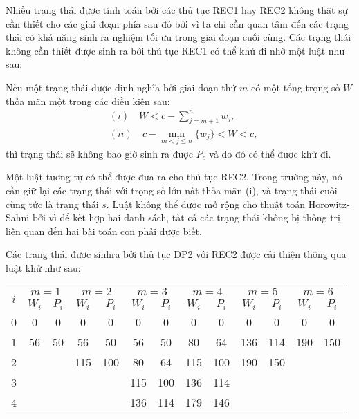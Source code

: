 Nhiều trạng thái được tính toán bởi các thủ tục REC1 hay REC2 không thật sự cần thiết cho các giai đoạn phía sau đó bởi vì ta chỉ cần quan tâm đến các trạng thái có khả năng sinh ra nghiệm tối ưu trong giai đoạn cuối cùng. Các trạng thái không cần thiết được sinh ra bởi thủ tục REC1 có thể khử đi nhờ một luật như sau:

Nếu một trạng thái được định nghĩa bởi giai đoạn thứ $m$ có một tổng trọng số $W$ thỏa mãn một trong các điều kiện sau:
\begin{align*}
    &(i)\quad W < c - \sum_{j=m+1}^nw_j,\\
    &(ii)\quad c - \min_{m < j \leq n}\{w_j\} < W < c,
\end{align*}
thì trạng thái sẽ không bao giờ sinh ra được $P_c$ và do đó có thể được khử đi.

Một luật tương tự có thể được đưa ra cho thủ tục REC2. Trong trường này, nó cần giữ lại các trạng thái với trọng số lớn nất thỏa mãn (i), và trạng thái cuối cùng tức là trạng thái $s$. Luật không thể được mở rộng cho thuật toán Horowitz-Sahni bởi vì để kết hợp hai danh sách, tất cả các trạng thái không bị thống trị liên quan đến hai bài toán con phải được biết.

\begin{example}
    Các trạng thái được sinhra bởi thủ tục DP2 với REC2 được cải thiện thông qua luật khử như sau:
    \begin{table}[H]
        \centering
        \begin{tabular}{ccccccccccccc}
        \toprule
        \multirow{2}{*}{$i$} & \multicolumn{2}{c}{$m=1$} & \multicolumn{2}{c}{$m=2$} & \multicolumn{2}{c}{$m=3$} & \multicolumn{2}{c}{$m=4$} & \multicolumn{2}{c}{$m=5$} & \multicolumn{2}{c}{$m=6$} \\ \cmidrule{2-13} 
                             & $W_i$    & $P_i$    & $W_i$    & $P_i$    & $W_i$    & $P_i$    & $W_i$    & $P_i$    & $W_i$    & $P_i$    & $W_i$    & $P_i$    \\ \midrule
        0                    & 0        & 0        & 0        & 0        & 0        & 0        & 0        & 0        & 0        & 0        & 0        & 0        \\ 
        1                    & 56       & 50       & 56       & 50       & 56       & 50       & 80       & 64       & 136      & 114      & 190      & 150      \\ 
        2                    &       &       & 115      & 100      & 80       & 64       & 115      & 100      & 190      & 150      &  &      \\ 
        3                    &       &       &       &       & 115      & 100      & 136      & 114      &           &          &           &          \\ 
        4                    &       &      &       &       & 136      & 114      & 179      & 146      &           &          &           &          \\ \bottomrule
        \end{tabular}
    \end{table}
\end{example}

